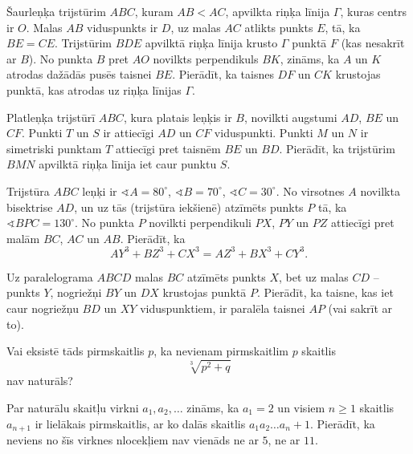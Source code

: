 \documentclass[11pt]{article}
\begin{document}
\begin{problem}[BwTst2018.9]
Šaurleņķa trijstūrim $ABC$, kuram $AB < AC$, apvilkta riņķa līnija $\Gamma$, kuras centrs ir $O$. 
Malas $AB$ viduspunkts ir $D$, uz malas $AC$ atlikts punkts $E$, tā, ka $BE = CE$. 
Trijstūrim $BDE$ apvilktā riņķa līnija krusto $\Gamma$ punktā $F$ (kas nesakrīt ar $B$). 
No punkta $B$ pret $AO$ novilkts perpendikuls $BK$, zināms, ka $A$ un $K$
atrodas dažādās pusēs taisnei $BE$. Pierādīt, ka taisnes $DF$ un $CK$ krustojas punktā, kas atrodas
uz riņķa līnijas $\Gamma$. 
\end{problem}

\begin{problem}[BwTst2018.10]
Platleņķa trijstūrī $ABC$, kura platais leņķis ir $B$, novilkti augstumi $AD$, $BE$ un $CF$. Punkti 
$T$ un $S$ ir attiecīgi $AD$ un $CF$ viduspunkti. Punkti $M$ un $N$ ir simetriski punktam $T$ attiecīgi pret
taisnēm $BE$ un $BD$. Pierādīt, ka trijstūrim $BMN$ apvilktā riņķa līnija iet caur punktu $S$. 
\end{problem}

\begin{problem}[BwTst2018.11]
Trijstūra $ABC$ leņķi ir $\sphericalangle A = 80^{\circ}$, $\sphericalangle B = 70^{\circ}$, $\sphericalangle C = 30^{\circ}$. 
No virsotnes $A$ novilkta bisektrise $AD$, un uz tās (trijstūra iekšienē) atzīmēts punkts $P$ tā, ka 
$\sphericalangle BPC = 130^{\circ}$. No punkta $P$ novilkti perpendikuli $PX$, $PY$ un $PZ$ attiecīgi pret 
malām $BC$, $AC$ un $AB$. Pierādīt, ka 
\[ AY^3 + BZ^3 + CX^3 = AZ^3 + BX^3 + CY^3. \] 
\end{problem}

\begin{problem}[BwTst2018.12]
Uz paralelograma $ABCD$ malas $BC$ atzīmēts punkts $X$, bet uz malas $CD$ -- punkts $Y$, nogriežņi $BY$ un $DX$ krustojas punktā $P$. 
Pierādīt, ka taisne, kas iet caur nogriežņu $BD$ un $XY$ viduspunktiem, ir paralēla taisnei $AP$ (vai sakrīt ar to). 
\end{problem}

\begin{problem}[BwTst2018.13]
Vai eksistē tāds pirmskaitlis $p$, ka nevienam pirmskaitlim $p$ skaitlis
\[ \sqrt[3]{p^2 + q} \]
nav naturāls?
\end{problem}

\begin{problem}[BwTst2018.14]
Par naturālu skaitļu virkni $a_1,a_2,\ldots$ zināms, ka $a_1 = 2$ un visiem $n \geq 1$ skaitlis 
$a_{n+1}$ ir lielākais pirmskaitlis, ar ko dalās skaitlis $a_1a_2\ldots{}a_n + 1$. Pierādīt, ka neviens no 
šīs virknes nlocekļiem nav vienāds ne ar $5$, ne ar $11$.
\end{problem}
\end{document}
